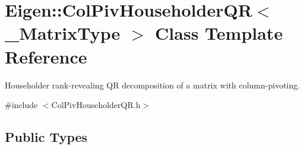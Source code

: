 \hypertarget{class_eigen_1_1_col_piv_householder_q_r}{}\section{Eigen\+::Col\+Piv\+Householder\+QR$<$ \+\_\+\+Matrix\+Type $>$ Class Template Reference}
\label{class_eigen_1_1_col_piv_householder_q_r}


Householder rank-\/revealing QR decomposition of a matrix with column-\/pivoting.  




{\ttfamily \#include $<$Col\+Piv\+Householder\+Q\+R.\+h$>$}

\subsection*{Public Types}
